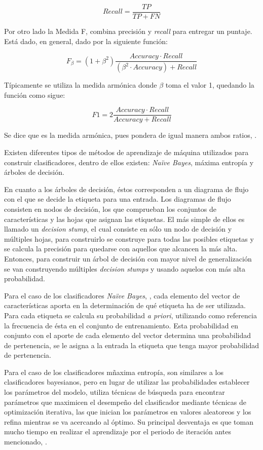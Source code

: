 \[
	Recall = \frac{TP}{TP+FN}
\]

Por otro lado la Medida F, combina precisión y \textit{recall} para entregar un puntaje. Está dado, en general, dado por la siguiente función:

\[
	F_{\beta} = (1+\beta^{2})\frac{Accuracy · Recall}{(\beta^{2} · Accuracy) + Recall}
\]

Típicamente se utiliza la medida armónica donde $\beta$ toma el valor 1, quedando la función como sigue:

\[
	F1 = 2\frac{Accuracy · Recall}{ Accuracy + Recall}
\]

Se dice que es la medida armónica, pues pondera de igual manera ambos ratios, \cite{FMeasureInterpret}.

Existen diferentes tipos de métodos de aprendizaje de máquina utilizados para construir clasificadores, dentro de ellos existen: \textit{Naïve Bayes}, máxima entropía y árboles de decisión.

En cuanto a los árboles de decisión, éstos corresponden a un diagrama de flujo con el que se decide la etiqueta para una entrada. Los diagramas de flujo consisten en nodos de decisión, los que comprueban los conjuntos de características y las hojas que asignan las etiquetas. El más simple de ellos es llamado un \textit{decision stump}, el cual consiste en sólo un nodo de decisión y múltiples hojas, para construirlo se construye para todas las posibles etiquetas y se calcula la precisión para quedarse con aquellos que alcancen la más alta. Entonces, para construir un árbol de decisión con mayor nivel de generalización se van construyendo múltiples \textit{decision stumps} y usando aquelos con más alta probabilidad.

Para el caso de los clasificadores \textit{Naïve Bayes}, \cite{NaiveBayes2}, cada elemento del vector de características aporta en la determinación de qué etiqueta ha de ser utilizada. Para cada etiqueta se calcula su probabilidad \textit{a priori}, utilizando como referencia la frecuencia de ésta en el conjunto de entrenamiento. Esta probabilidad en conjunto con el aporte de cada elemento del vector determina una probabilidad de pertenencia, se le asigna a la entrada la etiqueta que tenga mayor probabilidad de pertenencia.

Para el caso de los clasificadores mñaxima entropía, son similares a los clasificadores bayesianos, pero en lugar de utilizar las probabilidades establecer los parámetros del modelo, utiliza técnicas de búsqueda para encontrar parámetros que maximicen el desempeño del clasificador mediante técnicas de optimización iterativa, las que inician los parámetros en valores aleatoreos y los refina mientras se va acercando al óptimo. Su principal desventaja es que toman mucho tiempo en realizar el aprendizaje por el periodo de iteración antes mencionado, \cite{NPLK}.

